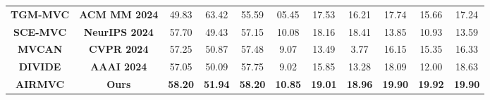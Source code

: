 \documentclass{article}
\theoremstyle{plain}
\theoremstyle{definition}
\theoremstyle{remark}
\begin{document}
\begin{itemize}
\begin{table}[]
{\begin{tabular}{cc|ccc|ccc|ccc}
\multicolumn{1}{c|}{\textbf{TGM-MVC}} & \textbf{ACM MM 2024}  & 49.83                                 & 63.42                                 & 55.59                                 & 05.45                                 & 17.53                                 & 16.21                                 & 17.74                                 & {\color[HTML]{3531FF} 15.66}          & 17.24                                 \\
\multicolumn{1}{c|}{\textbf{SCE-MVC}} & \textbf{NeurIPS 2024} & 57.70                                 & 49.43                                 & 57.15                                 & {\color[HTML]{3531FF} 10.08}          & {\color[HTML]{3531FF} 18.16}          & {\color[HTML]{3531FF} 18.41}          & 13.85                                 & 10.93                                 & 13.59                                 \\
\multicolumn{1}{c|}{\textbf{MVCAN}}   & \textbf{CVPR 2024}    & {\color[HTML]{3531FF} 57.25}          & {\color[HTML]{3531FF} 50.87}          & {57.48}          & 9.07                                  & 13.49                                 & 3.77                                  & 16.15                                 & 15.35                                 & 16.33                                 \\
\multicolumn{1}{c|}{\textbf{DIVIDE}}  & \textbf{AAAI 2024}    & 57.05                                 & 50.09                                 & {\color[HTML]{3531FF} 57.75}                                 & 9.02                                  & 15.85                                 & 13.28                                 & 18.09                                 & 12.00                                 & {\color[HTML]{3531FF} 18.63}          \\ \hline
\multicolumn{1}{c|}{\textbf{AIRMVC}} & \textbf{Ours}         & {\color[HTML]{FE0000} \textbf{58.20}} & {\color[HTML]{FE0000} \textbf{51.94}} & {\color[HTML]{FE0000} \textbf{58.20}} & {\color[HTML]{FE0000} \textbf{10.85}} & {\color[HTML]{FE0000} \textbf{19.01}} & {\color[HTML]{FE0000} \textbf{18.96}} & {\color[HTML]{FE0000} \textbf{19.90}} & {\color[HTML]{FE0000} \textbf{19.92}} & {\color[HTML]{FE0000} \textbf{19.90}} \\ \hline
\end{tabular}}
\label{com_res5}
\end{table}


\end{itemize}
\end{document}
